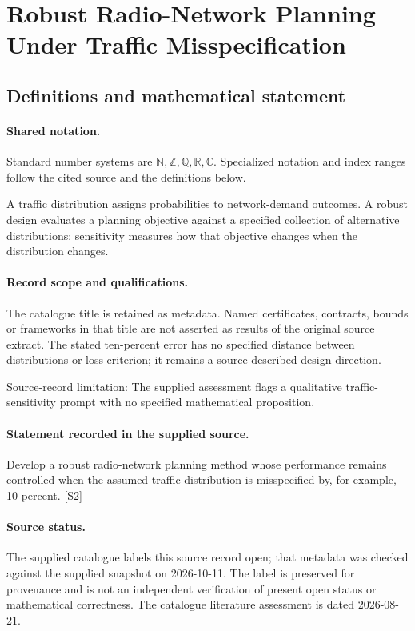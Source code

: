 \documentclass[11pt]{article}
\newcommand{\sref}[2]{\hyperlink{source:#1:#2}{[S#2]}}
\begin{document}
\section{Robust Radio-Network Planning Under Traffic Misspecification}\label{statement}

\subsection{Definitions and mathematical statement}

\paragraph{Shared notation.}Standard number systems are $\mathbb N,\mathbb Z,\mathbb Q,\mathbb R,\mathbb C$. Specialized notation and index ranges follow the cited source and the definitions below.


A traffic distribution assigns probabilities to network-demand outcomes. A robust design evaluates a planning objective against a specified collection of alternative distributions; sensitivity measures how that objective changes when the distribution changes.
\paragraph{Record scope and qualifications.}
The catalogue title is retained as metadata. Named certificates, contracts, bounds or frameworks in that title are not asserted as results of the original source extract.
The stated ten-percent error has no specified distance between distributions or loss criterion; it remains a source-described design direction.

Source-record limitation: The supplied assessment flags a qualitative traffic-sensitivity prompt with no specified mathematical proposition.
\paragraph{Statement recorded in the supplied source.}
Develop a robust radio-network planning method whose performance remains controlled when the assumed traffic distribution is misspecified by, for example, 10 percent. \sref{statement}{2}
\paragraph{Source status.}
The supplied catalogue labels this source record open; that metadata was checked against the supplied snapshot on 2026-10-11. The label is preserved for provenance and is not an independent verification of present open status or mathematical correctness. The catalogue literature assessment is dated 2026-08-21.
\end{document}
